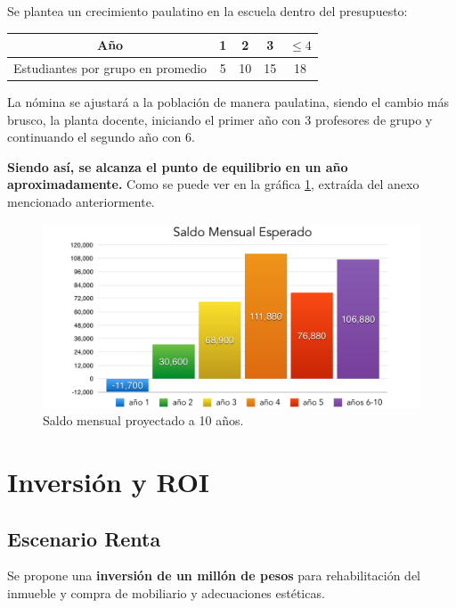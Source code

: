 \documentclass[10pt,letterpaper,oneside]{book}
\begin{document}
Se plantea un crecimiento paulatino en la escuela dentro del presupuesto:
\begin{center}
\begin{tabular}{|c|c|c|c|c|}
\hline 
Año & 1 & 2 & 3 & $\leq 4$ \\ 
\hline 
Estudiantes por grupo en promedio & 5 & 10 & 15 & 18 \\ 
\hline 
\end{tabular}
\end{center} 

La nómina se ajustará a la población de manera paulatina, siendo el cambio más brusco, la planta docente, iniciando el primer año con 3 profesores de grupo y continuando el segundo año con 6.

\vspace{0.3cm}
{\bf\large \color{red} Siendo así, se alcanza el punto de equilibrio en un año aproximadamente.} Como se puede ver en la gráfica \ref{mensualProyeccion}, extraída del anexo mencionado anteriormente.

\begin{figure}[h]
\begin{center}
\includegraphics[scale=0.4]{mensual10anos.pdf}
\caption{Saldo mensual proyectado a 10 años.}
\label{mensualProyeccion}
\end{center}
\end{figure}

\section{Inversión y ROI}
\subsection{Escenario Renta}
Se propone una {\bf inversión de un millón de pesos} para rehabilitación del inmueble y compra de mobiliario y adecuaciones estéticas.
\end{document}
